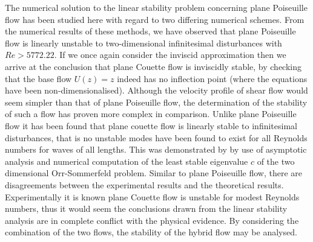 \documentclass[a4paper, 12pt, twoside, openright]{article}
\numberwithin{equation}{section}
\begin{document}
The numerical solution to the linear stability problem concerning plane Poiseuille flow has been studied here with regard to two differing numerical schemes. From the numerical results of these methods, we have observed that plane Poiseuille flow is linearly unstable to two-dimensional infinitesimal disturbances with $Re>5772.22$. If we once again consider the inviscid approximation then we arrive at the conclusion that plane Couette flow is inviscidly stable, by checking that the base flow $U(z)=z$ indeed has no inflection point (where the equations have been non-dimensionalised). Although the velocity profile of shear flow would seem simpler than that of plane Poiseuille flow, the determination of the stability of such a flow has proven more complex in comparison. Unlike plane Poiseuille flow it has been found that plane couette flow is linearly stable to infinitesimal disturbances, that is no unstable modes have been found to exist for all Reynolds numbers for waves of all lengths. This was demonstrated by \cite{Davey73} by use of asymptotic analysis and numerical computation of the least stable eigenvalue $c$ of the two dimensional Orr-Sommerfeld problem. Similar to plane Poiseuille flow, there are disagreements between the experimental results and the theoretical results. Experimentally it is known plane Couette flow is unstable for modest Reynolds numbers, thus it would seem the conclusions drawn from the linear stability analysis are in complete conflict with the physical evidence. By considering the combination of the two flows, the stability of the hybrid flow may be analysed.  %
\end{document}
